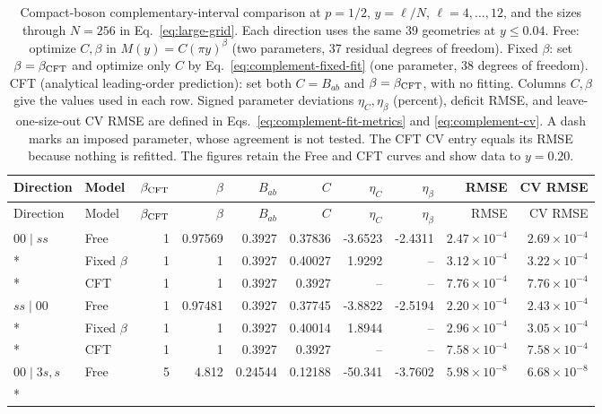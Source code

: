 \begin{longtable}{llrrrrrrrr}
\caption{Compact-boson complementary-interval comparison at $p=1/2$, $y=\ell/N$, $\ell=4,\ldots,12$, and the sizes through $N=256$ in Eq.~\eqref{eq:large-grid}. Each direction uses the same 39 geometries at $y\leq0.04$. Free: optimize $C,\beta$ in $M(y)=C(\pi y)^\beta$ (two parameters, 37 residual degrees of freedom). Fixed $\beta$: set $\beta=\beta_{\rm CFT}$ and optimize only $C$ by Eq.~\eqref{eq:complement-fixed-fit} (one parameter, 38 degrees of freedom). CFT (analytical leading-order prediction): set both $C=B_{ab}$ and $\beta=\beta_{\rm CFT}$, with no fitting. Columns $C,\beta$ give the values used in each row. Signed parameter deviations $\eta_C,\eta_\beta$ (percent), deficit RMSE, and leave-one-size-out CV RMSE are defined in Eqs.~\eqref{eq:complement-fit-metrics} and \eqref{eq:complement-cv}. A dash marks an imposed parameter, whose agreement is not tested. The CFT CV entry equals its RMSE because nothing is refitted. The figures retain the Free and CFT curves and show data to $y=0.20$.}
\label{tab:boson-complement-fits}\\\toprule
Direction & Model & $\beta_{\rm CFT}$ & $\beta$ & $B_{ab}$ & $C$ & $\eta_C$ & $\eta_\beta$ & RMSE & CV RMSE\\\midrule\endfirsthead
\toprule
Direction & Model & $\beta_{\rm CFT}$ & $\beta$ & $B_{ab}$ & $C$ & $\eta_C$ & $\eta_\beta$ & RMSE & CV RMSE\\\midrule\endhead
\bottomrule\endfoot
$00\mid ss$ & Free & 1 & 0.97569 & 0.3927 & 0.37836 & -3.6523 & -2.4311 & $2.47\!\times\!10^{-4}$ & $2.69\!\times\!10^{-4}$\\*
 & Fixed $\beta$ & 1 & 1 & 0.3927 & 0.40027 & 1.9292 & -- & $3.12\!\times\!10^{-4}$ & $3.22\!\times\!10^{-4}$\\*
 & CFT & 1 & 1 & 0.3927 & 0.3927 & -- & -- & $7.76\!\times\!10^{-4}$ & $7.76\!\times\!10^{-4}$\\
\addlinespace[3pt]
$ss\mid 00$ & Free & 1 & 0.97481 & 0.3927 & 0.37745 & -3.8822 & -2.5194 & $2.20\!\times\!10^{-4}$ & $2.43\!\times\!10^{-4}$\\*
 & Fixed $\beta$ & 1 & 1 & 0.3927 & 0.40014 & 1.8944 & -- & $2.96\!\times\!10^{-4}$ & $3.05\!\times\!10^{-4}$\\*
 & CFT & 1 & 1 & 0.3927 & 0.3927 & -- & -- & $7.58\!\times\!10^{-4}$ & $7.58\!\times\!10^{-4}$\\
\addlinespace[3pt]
$00\mid 3s,s$ & Free & 5 & 4.812 & 0.24544 & 0.12188 & -50.341 & -3.7602 & $5.98\!\times\!10^{-8}$ & $6.68\!\times\!10^{-8}$\\*

\end{longtable}
